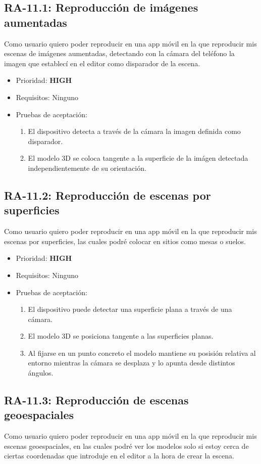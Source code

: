 \subsection{RA-11.1: Reproducción de imágenes aumentadas}
Como usuario quiero poder reproducir en una app móvil en la que reproducir mis escenas de imágenes aumentadas, detectando con la cámara del teléfono la imagen que establecí en el editor como disparador de la escena.

\begin{itemize}
    \item Prioridad: \textbf{HIGH}
    \item Requisitos: Ninguno
    \item Pruebas de aceptación:
	\begin{enumerate}
		\item El dispositivo detecta a través de la cámara la imagen definida como disparador.
		\item El modelo 3D se coloca tangente a la superficie de la imágen detectada independientemente de su orientación.
	\end{enumerate}
\end{itemize}

\subsection{RA-11.2: Reproducción de escenas por superficies}
Como usuario quiero poder reproducir en una app móvil en la que reproducir mis escenas por superficies, las cuales podré colocar en sitios como mesas o suelos. 

\begin{itemize}
    \item Prioridad: \textbf{HIGH}
    \item Requisitos: Ninguno
    \item Pruebas de aceptación: 
    \begin{enumerate}
		\item El dispositivo puede detectar una superficie plana a través de una cámara.
		\item El modelo 3D se posiciona tangente a las superficies planas.
		\item Al fijarse en un punto concreto el modelo mantiene su posisión relativa al entorno mientras la cámara se desplaza y lo apunta desde distintos ángulos.
	\end{enumerate}
\end{itemize}

\subsection{RA-11.3: Reproducción de escenas geoespaciales}
Como usuario quiero poder reproducir en una app móvil en la que reproducir mis escenas geoespaciales, en las cuales podré ver los modelos solo si estoy cerca de ciertas coordenadas que introduje en el editor a la hora de crear la escena.

